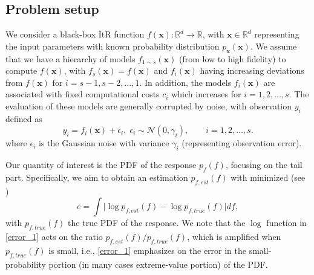 \documentclass[11pt]{article}
\begin{document}
\subsection{Problem setup}
We consider a black-box ItR function $f(\mathbf{x}): \mathbb{R}^{d} \to \mathbb{R}$, with $\mathbf{x}\in \mathbb{R}^{d}$ representing the input parameters with known probability distribution $p_{\mathbf{x}}(\mathbf{x})$. We assume that we have a hierarchy of models $f_{1\sim s}(\mathbf{x})$ (from low to high fidelity) to compute $f(\mathbf{x})$, with $f_s(\mathbf{x})=f(\mathbf{x})$ and $f_i(\mathbf{x})$ having increasing deviations from $f(\mathbf{x})$ for $i=s-1, s-2, ..., 1$. In addition, the models $f_i(\mathbf{x})$ are associated with fixed computational costs $c_i$ which increases for $i=1, 2, ..., s$. The evaluation of these models are generally corrupted by noise, with observation $y_i$ defined as
\begin{equation}
    y_i = f_i(\mathbf{x}) + \epsilon_i, \;  \epsilon_i \sim \mathcal{N}(0, \gamma_i),  \quad \quad  i=1,2,\dots, s.
\label{noise}
\end{equation}
where $\epsilon_i$ is the Gaussian noise with variance $\gamma_i$ (representing observation error).  


Our quantity of interest is the PDF of the response $p_f(f)$, focusing on the tail part. Specifically, we aim to obtain an estimation $p_{f,est}(f)$ with minimized (see \cite{mohamad2018sequential})
\begin{equation}
    e = \int \Big|\log p_{f,est}(f) - \log p_{f,true}(f) \Big| df,
    \label{error_1}
\end{equation}
with $p_{f,true}(f)$ the true PDF of the response. We note that the $\log$ function in \eqref{error_1} acts on the ratio $p_{f,est}(f)/p_{f,true}(f)$, which is amplified when $p_{f,true}(f)$ is small, i.e., \eqref{error_1} emphasizes on the error in the small-probability portion (in many cases extreme-value portion) of the PDF.  
\end{document}
